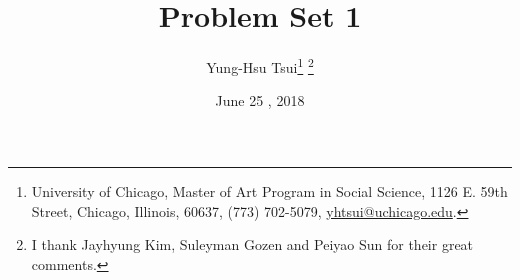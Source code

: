 \documentclass[letterpaper,12pt]{article}
\theoremstyle{definition}
\begin{document}
	
	\title{Problem Set 1\\
	}
	\author{
		Yung-Hsu Tsui\footnote{University of Chicago, Master of Art Program in Social Science, 1126 E. 59th Street, Chicago, Illinois, 60637, (773) 702-5079, \href{mailto:}{yhtsui@uchicago.edu}.} \footnote{I thank Jayhyung Kim, Suleyman Gozen and Peiyao Sun for their great comments.}\\[-2pt]
	}
	\date{June 25 ,  2018 }
	\vspace{-9mm}
	\maketitle
	\thispagestyle{empty}
	
	\pagestyle{fancy}
	\fancyhf{}
	\cfoot{\thepage}
	
\end{document}
